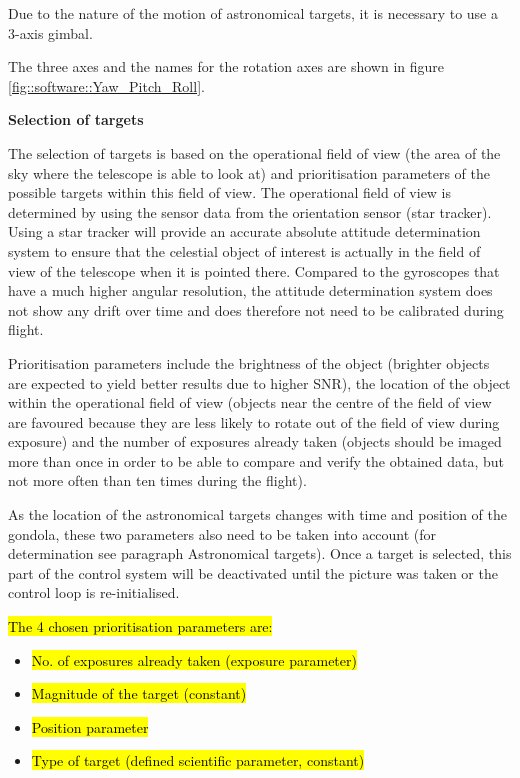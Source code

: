 Due to the nature of the motion of astronomical targets, it is necessary to use a 3-axis gimbal.

The three axes and the names for the rotation axes are shown in figure \mbox{\ref{fig::software::Yaw_Pitch_Roll}}.

\textbf{Selection of targets}

The selection of targets is based on the operational field of view (the area of the sky where the telescope is able to look at) and prioritisation parameters of the possible targets within this field of view. The operational field of view is determined by using the sensor data from the orientation sensor (star tracker). Using a star tracker will provide an accurate absolute attitude determination system to ensure that the celestial object of interest is actually in the field of view of the telescope when it is pointed there. Compared to the gyroscopes that have a much higher angular resolution, the attitude determination system does not show any drift over time and does therefore not need to be calibrated during flight.

Prioritisation parameters include the brightness of the object (brighter objects are expected to yield better results due to higher SNR), the location of the object within the operational field of view (objects near the centre of the field of view are favoured because they are less likely to rotate out of the field of view during exposure) and the number of exposures already taken (objects should be imaged more than once in order to be able to compare and verify the obtained data, but not more often than ten times during the flight). 

As the location of the astronomical targets changes with time and position of the gondola, these two parameters also need to be taken into account (for determination see paragraph Astronomical targets). Once a target is selected, this part of the control system will be deactivated until the picture was taken or the control loop is re-initialised.

\hl{The 4 chosen prioritisation parameters are: }
\begin{itemize}
	\item \hl{No. of exposures already taken (exposure parameter)}
	\item \hl{Magnitude of the target (constant)}
	\item \hl{Position parameter}
	\item \hl{Type of target  (defined scientific parameter, constant)}
\end{itemize}

